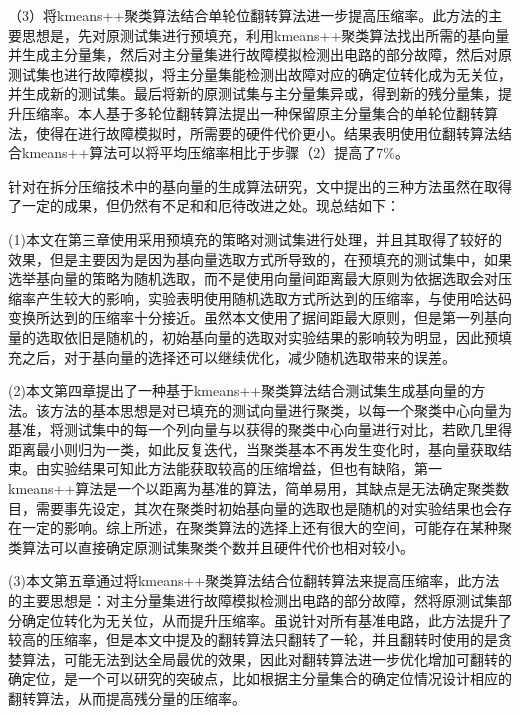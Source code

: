 （3）将kmeans++聚类算法结合单轮位翻转算法进一步提高压缩率。此方法的主要思想是，先对原测试集进行预填充，利用kmeans++聚类算法找出所需的基向量并生成主分量集，然后对主分量集进行故障模拟检测出电路的部分故障，然后对原测试集也进行故障模拟，将主分量集能检测出故障对应的确定位转化成为无关位，并生成新的测试集。最后将新的原测试集与主分量集异或，得到新的残分量集，提升压缩率。本人基于多轮位翻转算法提出一种保留原主分量集合的单轮位翻转算法，使得在进行故障模拟时，所需要的硬件代价更小。结果表明使用位翻转算法结合kmeans++算法可以将平均压缩率相比于步骤（2）提高了7\%。

针对在拆分压缩技术中的基向量的生成算法研究，文中提出的三种方法虽然在取得了一定的成果，但仍然有不足和和厄待改进之处。现总结如下：

(1)本文在第三章使用采用预填充的策略对测试集进行处理，并且其取得了较好的效果，但是主要因为是因为基向量选取方式所导致的，在预填充的测试集中，如果选举基向量的策略为随机选取，而不是使用向量间距离最大原则为依据选取会对压缩率产生较大的影响，实验表明使用随机选取方式所达到的压缩率，与使用哈达码变换所达到的压缩率十分接近。虽然本文使用了据间距最大原则，但是第一列基向量的选取依旧是随机的，初始基向量的选取对实验结果的影响较为明显，因此预填充之后，对于基向量的选择还可以继续优化，减少随机选取带来的误差。

(2)本文第四章提出了一种基于kmeans++聚类算法结合测试集生成基向量的方法。该方法的基本思想是对已填充的测试向量进行聚类，以每一个聚类中心向量为基准，将测试集中的每一个列向量与以获得的聚类中心向量进行对比，若欧几里得距离最小则归为一类，如此反复迭代，当聚类基本不再发生变化时，基向量获取结束。由实验结果可知此方法能获取较高的压缩增益，但也有缺陷，第一kmeans++算法是一个以距离为基准的算法，简单易用，其缺点是无法确定聚类数目，需要事先设定，其次在聚类时初始基向量的选取也是随机的对实验结果也会存在一定的影响。综上所述，在聚类算法的选择上还有很大的空间，可能存在某种聚类算法可以直接确定原测试集聚类个数并且硬件代价也相对较小。

(3)本文第五章通过将kmeans++聚类算法结合位翻转算法来提高压缩率，此方法的主要思想是：对主分量集进行故障模拟检测出电路的部分故障，然将原测试集部分确定位转化为无关位，从而提升压缩率。虽说针对所有基准电路，此方法提升了较高的压缩率，但是本文中提及的翻转算法只翻转了一轮，并且翻转时使用的是贪婪算法，可能无法到达全局最优的效果，因此对翻转算法进一步优化增加可翻转的确定位，是一个可以研究的突破点，比如根据主分量集合的确定位情况设计相应的翻转算法，从而提高残分量的压缩率。
